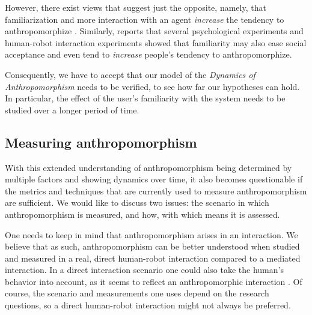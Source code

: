 \documentclass{frontiersSCNS} %
\begin{document}
However, there exist views that suggest just the opposite, namely, that
familiarization and more interaction with an agent \textit{increase} the
tendency to anthropomorphize \citep{eddy_attribution_1993}. Similarly,
\cite{duffy_anthropomorphism_2003} reports that several psychological
experiments and human-robot interaction experiments showed that familiarity may
also ease social acceptance and even tend to \textit{increase} people's tendency
to anthropomorphize.

Consequently, we have to accept that our model of the \emph{Dynamics of
Anthropomorphism} needs to be verified, to see how far our hypotheses can hold.
In particular, the effect of the user's familiarity with the system needs to be
studied over a longer period of time.


\subsection{Measuring anthropomorphism}
\label{sec:measuring}

With this extended understanding of anthropomorphism being determined by
multiple factors and showing dynamics over time, it also becomes questionable if
the metrics and techniques that are currently used to measure anthropomorphism
are sufficient. We would like to discuss two issues: the scenario in which
anthropomorphism is measured, and how, with which means it is assessed.

One needs to keep in mind that anthropomorphism arises in an interaction. We
believe that as such, anthropomorphism can be better understood when studied and
measured in a real, direct human-robot interaction compared to a mediated
interaction. In a direct interaction scenario one could also take the human's
behavior into account, as it seems to reflect an anthropomorphic interaction
\citep{krach_can_2008,hegel_understanding_2008,weiss_i_2009}.  Of course, the
scenario and measurements one uses depend on the research questions, so a direct
human-robot interaction might not always be preferred.
\end{document}
